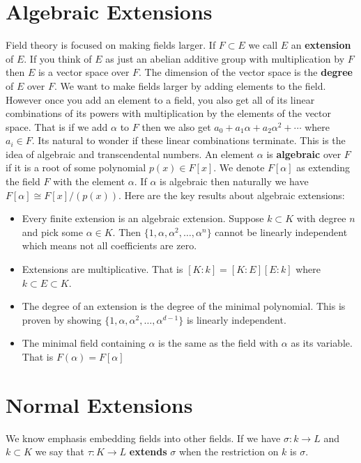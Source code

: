 \documentclass[12pt]{book}
\begin{document}
\section{Algebraic Extensions}
Field theory is focused on making fields larger. If $F \subset E$ we call $E$ an \textbf{extension} of $E$. If you think of $E$ as just an abelian additive group with multiplication by $F$ then $E$ is a vector space over $F$. The dimension of the vector space is the \textbf{degree} of $E$ over $F$. We want to make fields larger by adding elements to the field. However once you add an element to a field, you also get all of its linear combinations of its powers with multiplication by the elements of the vector space. That is if we add $\alpha$ to $F$ then we also get $a_0+a_1 \alpha + a_2 \alpha^2 + \cdots$ where $a_i \in F$. Its natural to wonder if these linear combinations terminate. This is the idea of algebraic and transcendental numbers. An element $\alpha$ is \textbf{algebraic} over $F$ if it is a root of some polynomial $p(x) \in F[x]$. We denote $F[\alpha]$ as extending the field $F$ with the element $\alpha$. If $\alpha$ is algebraic then naturally we have $F[\alpha] \cong F[x]/(p(x))$. Here are the key results about algebraic extensions:
\begin{itemize}
  \item Every finite extension is an algebraic extension. Suppose $k \subset K$ with degree $n$ and pick some $\alpha \in K$. Then $\{ 1,\alpha, \alpha^2, \ldots, \alpha^{n} \}$ cannot be linearly independent which means not all coefficients are zero.
  \item Extensions are multiplicative. That is $[K:k]=[K:E][E:k]$ where $k \subset E \subset K$.
  \item The degree of an extension is the degree of the minimal polynomial. This is proven by showing $\{ 1,\alpha, \alpha^2, \ldots, \alpha^{d-1} \}$ is linearly independent.
  \item The minimal field containing $\alpha$ is the same as the field with $\alpha$ as its variable. That is $F(\alpha)=F[\alpha]$
\end{itemize}
 
 \section{Normal Extensions}
We know emphasis embedding fields into other fields. If we have $\sigma: k \rightarrow L$ and $k \subset K$ we say that $\tau: K \rightarrow L$ \textbf{extends} $\sigma$ when the restriction on $k$ is $\sigma$.
\end{document}
